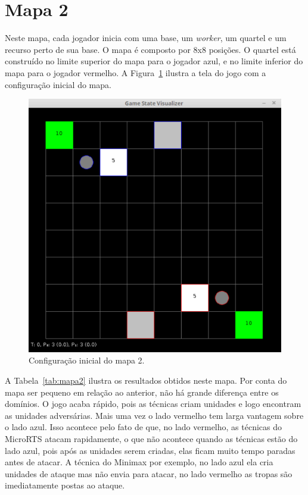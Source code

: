 \section{Mapa 2}

Neste mapa, cada jogador inicia com uma base, um \textit{worker}, um quartel e um recurso perto de sua base.
O mapa é composto por 8x8 posições.
O quartel está construído no limite superior do mapa para o jogador azul, e no limite inferior do mapa para o jogador vermelho.
A Figura~\ref{fig:mapa8x8quartel} ilustra a tela do jogo com a configuração inicial do mapa.

\begin{figure}[ht]
	\centering
	\includegraphics[width=.5\textwidth]{fig/map8x8quartel.pdf}
	\caption{Configuração inicial do mapa 2.}
	\label{fig:mapa8x8quartel}
\end{figure}

A Tabela~\ref{tab:mapa2} ilustra os resultados obtidos neste mapa.
Por conta do mapa ser pequeno em relação ao anterior, não há grande diferença entre os domínios.
O jogo acaba rápido, pois as técnicas criam unidades e logo encontram as unidades adversárias.
Mais uma vez o lado vermelho tem larga vantagem sobre o lado azul. 
Isso acontece pelo fato de que, no lado vermelho, as técnicas do MicroRTS atacam rapidamente, o que não acontece quando as técnicas estão do lado azul, pois após as unidades serem criadas, elas ficam muito tempo paradas antes de atacar.
A técnica do Minimax por exemplo, no lado azul ela cria unidades de ataque mas não envia para atacar, no lado vermelho as tropas são imediatamente postas ao ataque.

